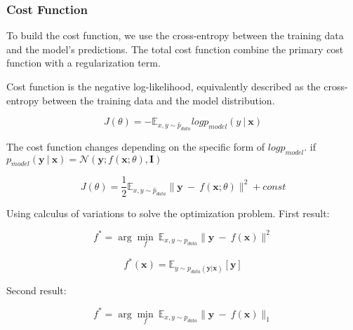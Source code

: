 
\subsubsection{Cost Function}
To build the cost function, we use the cross-entropy between the training data and the model’s predictions. The total cost function combine the primary cost function with a regularization term.

Cost function is the negative log-likelihood, equivalently described as the cross-entropy between the training data and the model distribution.

  \begin{equation} \tag{6.12}
   \label{eq_6_12}
   J(\theta)=-       \mathbb{E}_{x,y\sim\hat{\mathit{p}}_{data}}log\mathit{p}_{model}    (y\ |\   \bm{x})
  \end{equation}

The cost function changes depending on the specific form of $logp_{model}$.
if $p_{model}(\bm{y}\  |\ \bm{x})=\mathcal{N}(\bm{y};\mathit{f}(\bm{x};\theta),\bm{I})$

  \begin{equation} \tag{6.13}
   \label{eq_6_13}
   J(\theta)=\frac{1}{2}\mathbb{E}_{x,y\sim\hat{\mathit{p}}_{data}}\|\bm{y}\ -\ \mathit{f}(\bm{x};\theta)\|^2+const
  \end{equation}

Using calculus of variations to solve the optimization problem.
First result:

  \begin{equation} \tag{6.14}
   \label{eq_6_14}
   \mathit{f}^*=\arg\min_{\mathit{f}}\ \mathbb{E}_{x,y\sim\mathit{p}_{data}}\|\bm{y}\ -\ \mathit{f}(\bm{x})\|^2
  \end{equation}
  
  \begin{equation} \tag{6.15}
   \label{eq_6_15}
   \mathit{f}^*(\bm{x})=\mathbb{E}_{y\sim\mathit{p}_{data}(\bm{y}|\bm{x})}[\bm{y}]
  \end{equation}
  
Second result:

  \begin{equation} \tag{6.16}
   \label{eq_6_16}
   \mathit{f}^*=\arg\min_{\mathit{f}}\ \mathbb{E}_{x,y\sim\mathit{p}_{data}}\|\bm{y}\ -\ \mathit{f}(\bm{x})\|_1
  \end{equation}

